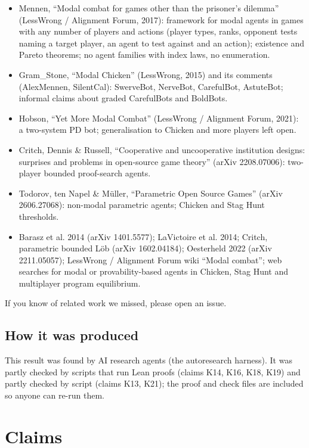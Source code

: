 \documentclass{article}
\begin{document}
\begin{itemize}
\item Mennen, ``Modal combat for games other than the prisoner's dilemma'' (LessWrong / Alignment Forum, 2017): framework for modal agents in games with any number of players and actions (player types, ranks, opponent tests naming a target player, an agent to test against and an action); existence and Pareto theorems; no agent families with index laws, no enumeration.
\item Gram\_Stone, ``Modal Chicken'' (LessWrong, 2015) and its comments (AlexMennen, SilentCal): SwerveBot, NerveBot, CarefulBot, AstuteBot; informal claims about graded CarefulBots and BoldBots.
\item Hobson, ``Yet More Modal Combat'' (LessWrong / Alignment Forum, 2021): a two-system PD bot; generalisation to Chicken and more players left open.
\item Critch, Dennis \& Russell, ``Cooperative and uncooperative institution designs: surprises and problems in open-source game theory'' (arXiv 2208.07006): two-player bounded proof-search agents.
\item Todorov, ten Napel \& Müller, ``Parametric Open Source Games'' (arXiv 2606.27068): non-modal parametric agents; Chicken and Stag Hunt thresholds.
\item Barasz et al. 2014 (arXiv 1401.5577); LaVictoire et al. 2014; Critch, parametric bounded Löb (arXiv 1602.04184); Oesterheld 2022 (arXiv 2211.05057); LessWrong / Alignment Forum wiki ``Modal combat''; web searches for modal or provability-based agents in Chicken, Stag Hunt and multiplayer program equilibrium.
\end{itemize}

If you know of related work we missed, please open an issue.

\subsection*{How it was produced}

This result was found by AI research agents (the autoresearch harness). It was partly checked by scripts that run Lean proofs (claims K14, K16, K18, K19) and partly checked by script (claims K13, K21); the proof and check files are included so anyone can re-run them.

\section{Claims}
\end{document}
